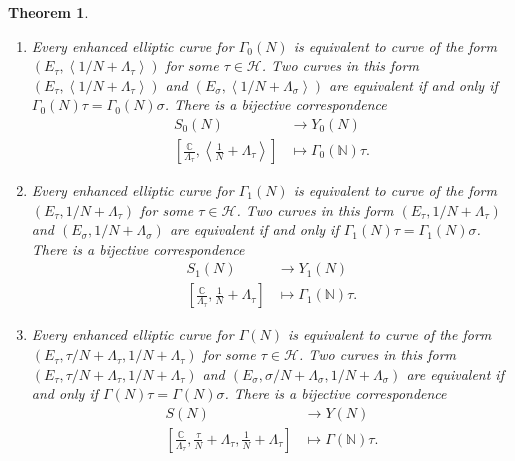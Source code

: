 \documentclass[a4paper]{article}
\theoremstyle{theoremdd}
\newtheorem{theorem}{Theorem}[section]
\theoremstyle{definitiondd}
\theoremstyle{remarkdd}
\newcommand{\N}{\mathbb{N}}
\newcommand{\C}{\mathbb{C}}
\begin{document}
\begin{theorem}\label{thm:correspondence_modulispaces}
	\hspace{\linewidth}
	\begin{enumerate}
		\item Every enhanced elliptic curve for $\Gamma_0(N)$ is equivalent to curve of the form $(E_\tau, \left<1 / N + \Lambda_\tau \right>)$ for some $\tau \in \mathcal{H} $. 
			Two curves in this form $(E_\tau, \left<1 / N + \Lambda_\tau \right>)$ and $(E_\sigma, \left<1 / N + \Lambda_\sigma \right>)$ are equivalent if and only if $\Gamma_0\left( N \right) \tau = \Gamma_0(N) \sigma$. There is a bijective correspondence
			\begin{align*}
				S_0(N) &\longrightarrow Y_0(N) \\
				\left[\frac{\C}{\Lambda_\tau}, \left<\frac{1}{N} + \Lambda_\tau \right>\right] &\longmapsto \Gamma_0(\N)\tau
			.\end{align*}
	
		\item Every enhanced elliptic curve for $\Gamma_1(N)$ is equivalent to curve of the form $(E_\tau, 1 / N + \Lambda_\tau )$ for some $\tau \in \mathcal{H} $. 
			Two curves in this form $(E_\tau, 1 / N + \Lambda_\tau )$ and $(E_\sigma, 1 / N + \Lambda_\sigma)$ are equivalent if and only if $\Gamma_1\left( N \right) \tau = \Gamma_1(N) \sigma$. There is a bijective correspondence
			\begin{align*}
				S_1(N) &\longrightarrow Y_1(N) \\
				\left[\frac{\C}{\Lambda_\tau}, \frac{1}{N} + \Lambda_\tau \right] &\longmapsto \Gamma_1(\N)\tau
			.\end{align*}
		\item Every enhanced elliptic curve for $\Gamma(N)$ is equivalent to curve of the form $(E_\tau, \tau / N + \Lambda_\tau, 1 / N + \Lambda_\tau )$ for some $\tau \in \mathcal{H} $. 
			Two curves in this form $(E_\tau, \tau / N + \Lambda_\tau,  1 / N + \Lambda_\tau )$ and $(E_\sigma, \sigma / N + \Lambda_\sigma,1 / N + \Lambda_\sigma)$ are equivalent if and only if $\Gamma\left( N \right) \tau = \Gamma(N) \sigma$. There is a bijective correspondence
			\begin{align*}
				S(N) &\longrightarrow Y(N) \\
				\left[\frac{\C}{\Lambda_\tau}, \frac{\tau}{N} + \Lambda_\tau, \frac{1}{N} + \Lambda_\tau \right] &\longmapsto \Gamma(\N)\tau
			.\end{align*}
	\end{enumerate}
\end{theorem}
\end{document}
